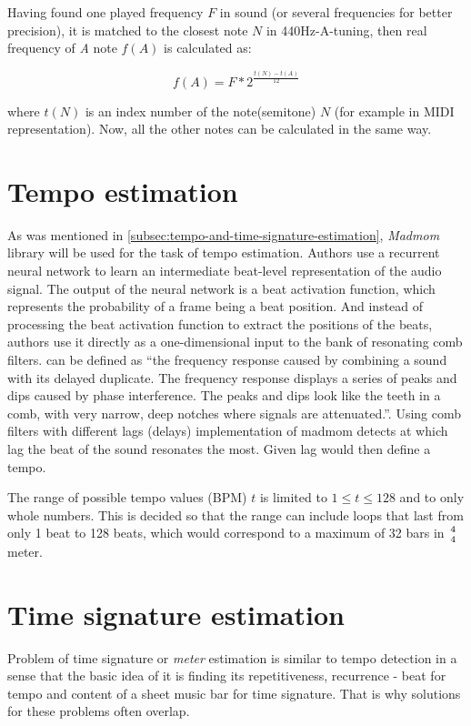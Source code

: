 Having found one played frequency $F$ in sound (or several frequencies for better precision), it is matched to
the closest note $N$ in 440Hz-A-tuning, then real frequency of \textit{A} note $f(A)$ is calculated as:

\[ f(A) = F * 2^\frac{t(N)-t(A)}{12} \]

where $t(N)$ is an index number of the note(semitone) $N$ (for example in \ac{MIDI} representation). Now, all the other
notes can be calculated in the same way.

\section{Tempo estimation}\label{sec:tempo-estimation}
As was mentioned in \cref{subsec:tempo-and-time-signature-estimation}, \textit{Madmom} library will be used for
the task of tempo estimation. Authors use a recurrent neural network to learn an intermediate beat-level representation
of the audio signal. The output of the neural network is a beat activation function, which represents the probability of
a frame being a beat position. And instead of processing the beat activation function to extract the positions of
the beats, authors use it directly as a one-dimensional input to the bank of resonating comb filters.  can be defined as ``the frequency response caused by combining a sound with its delayed duplicate.
The frequency response displays a series of peaks and dips caused by phase interference. The peaks and dips look like
the teeth in a comb, with very narrow, deep notches where signals are attenuated.''\cite{comb-filter}. Using comb
filters with different lags (delays) implementation of madmom detects at which lag the beat of the sound resonates
the most. Given lag would then define a tempo.

The range of possible tempo values (\ac{BPM}) $t$ is limited to $1 \le t \le 128$ and to only whole numbers. This is
decided so that the range can include loops that last from only 1 beat to 128 beats, which would correspond to a maximum
of 32 bars in $4\atop4$ meter.

\section{Time signature estimation}\label{sec:time-signature-estimation}
Problem of time signature or \textit{meter} estimation is similar to tempo detection in a sense that the basic idea of
it is finding its repetitiveness, recurrence - beat for tempo and content of a sheet music bar for time signature. That
is why solutions for these problems often overlap.

